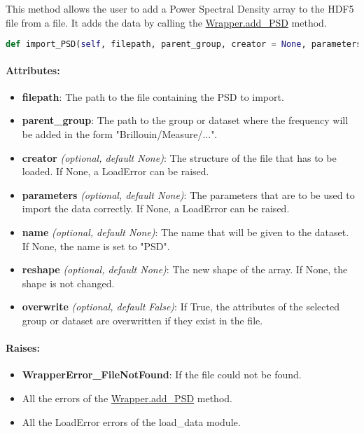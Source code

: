 This method allows the user to add a Power Spectral Density array to the HDF5 file from a file. It adds the data by calling the \hyperref[subchapter:wrapper.add_psd]{Wrapper.add\_PSD} method.


\begin{lstlisting}[language=Python]
def import_PSD(self, filepath, parent_group, creator = None, parameters = None, name = None, reshape = None, overwrite = False):
\end{lstlisting}

\paragraph{Attributes:}

\begin{itemize}
    \item \textbf{filepath}: The path to the file containing the PSD to import.
    \item \textbf{parent\_group}: The path to the group or dataset where the frequency will be added in the form "Brillouin/Measure/...".
    \item \textbf{creator} \textit{(optional, default None)}: The structure of the file that has to be loaded. If None, a LoadError can be raised.
    \item \textbf{parameters} \textit{(optional, default None)}: The parameters that are to be used to import the data correctly.  If None, a LoadError can be raised.
    \item \textbf{name} \textit{(optional, default None)}: The name that will be given to the dataset. If None, the name is set to "PSD".
    \item \textbf{reshape} \textit{(optional, default None)}: The new shape of the array. If None, the shape is not changed.
    \item \textbf{overwrite} \textit{(optional, default False)}: If True, the attributes of the selected group or dataset are overwritten if they exist in the file.
\end{itemize}


\paragraph{Raises:}
\begin{itemize}
    \item \textbf{WrapperError\_FileNotFound}: If the file could not be found.
    \item All the errors of the \hyperref[subchapter:wrapper.add_psd]{Wrapper.add\_PSD} method.
    \item All the LoadError errors of the load\_data module.
\end{itemize}